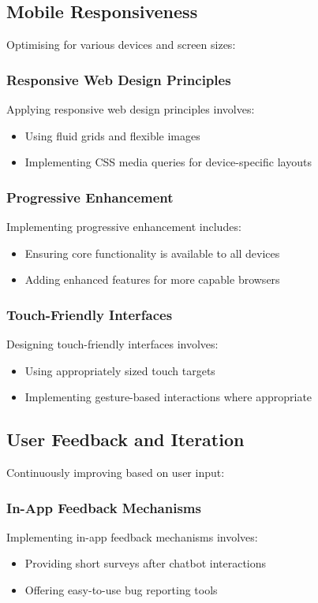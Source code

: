 \documentclass[15pt,a4paper]{article}
\begin{document}
\begin{multicols}{2}
\subsection{Mobile Responsiveness}
Optimising for various devices and screen sizes:

\subsubsection*{Responsive Web Design Principles}
Applying responsive web design principles \textit{\parencite[pp. 30-60]{Frain2023}} involves:
\begin{itemize}
    \item Using fluid grids and flexible images
    \item Implementing CSS media queries for device-specific layouts
\end{itemize}

\subsubsection*{Progressive Enhancement}
Implementing progressive enhancement \textit{\parencite[pp. 20-50]{ChampeonFinck2024}} includes:
\begin{itemize}
    \item Ensuring core functionality is available to all devices
    \item Adding enhanced features for more capable browsers
\end{itemize}

\subsubsection*{Touch-Friendly Interfaces}
Designing touch-friendly interfaces \textit{\parencite[pp. 80-120]{HooberBerkman2023}} involves:
\begin{itemize}
    \item Using appropriately sized touch targets
    \item Implementing gesture-based interactions where appropriate
\end{itemize}

\subsection{User Feedback and Iteration}
Continuously improving based on user input:

\subsubsection*{In-App Feedback Mechanisms}
Implementing in-app feedback mechanisms \textit{\parencite[pp. 100-150]{TullisAlbert2024}} involves:
\begin{itemize}
    \item Providing short surveys after chatbot interactions
    \item Offering easy-to-use bug reporting tools
\end{itemize}


\end{multicols}
\end{document}
